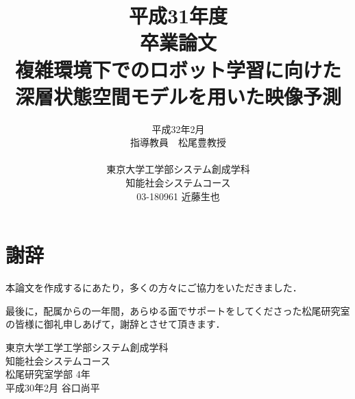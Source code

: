 \documentclass[a4paper,12pt,oneside,openany,dvipdfmx]{jsbook}
\title{
    平成31年度\\
    卒業論文\\
    複雑環境下でのロボット学習に向けた\\
    深層状態空間モデルを用いた映像予測
}
\author{
    平成32年2月\\
    指導教員　松尾豊教授\\
    \\
    東京大学工学部システム創成学科\\
    知能社会システムコース\\
    03-180961 近藤生也
}
\date{}
\begin{document}
\maketitle
\pagestyle{plain}
\setlength{\baselineskip}{22truept}
\frontmatter

\setcounter{tocdepth}{2}
\tableofcontents
\listoffigures
\listoftables
\mainmatter

% 
% 

% 
% 

\appendix
%
\chapter*{謝辞}
本論文を作成するにあたり，多くの方々にご協力をいただきました．

最後に，配属からの一年間，あらゆる面でサポートをしてくださった松尾研究室の皆様に御礼申しあげて，謝辞とさせて頂きます．


\begin{flushright}
東京大学工学工学部システム創成学科\\
知能社会システムコース\\
松尾研究室学部 4年\\
平成30年2月 谷口尚平\\
\end{flushright}

\end{document}
